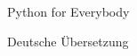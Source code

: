 \begin{titlepage}
\begin{center}
\vspace*{30mm}

\sffamily
\LARGE
Python for Everybody

\vspace{15mm}

\large
Deutsche Übersetzung
\end{center}
\end{titlepage}

\normalsize
\normalfont
